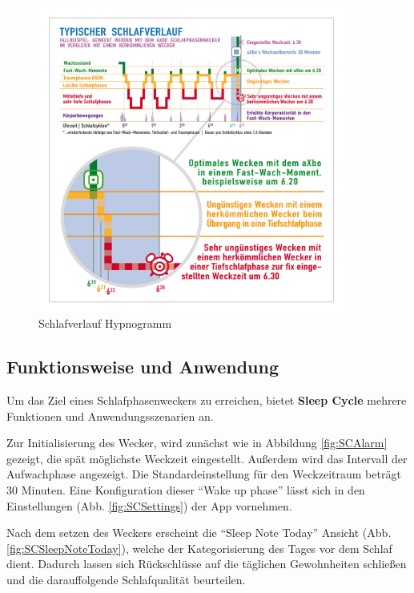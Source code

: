 \begin{figure}[h]
\centering
\includegraphics[width=0.9\textwidth]{images/aXbo_Schlafverlauf_Hypnogramm_DE.png}
\caption{Schlafverlauf Hypnogramm \cite{fig:Hypnogramm}}
\label{fig:Hypnogramm}
\end{figure}


\subsection{Funktionsweise und Anwendung}
\label{ch:Apps:sec:Sleepcycle:subsec:FuA}

Um das Ziel eines Schlafphasenweckers zu erreichen, bietet \textbf{Sleep Cycle} mehrere Funktionen und Anwendungsszenarien an.

Zur Initialisierung des Wecker, wird zunächst wie in Abbildung \ref{fig:SCAlarm} gezeigt, die spät möglichste Weckzeit eingestellt.
Außerdem wird das Intervall der Aufwachphase angezeigt.
Die Standardeinstellung für den Weckzeitraum beträgt 30 Minuten.
Eine Konfiguration dieser "`Wake up phase"' lässt sich in den Einstellungen (Abb. \ref{fig:SCSettings}) der App vornehmen.

Nach dem setzen des Weckers erscheint die "`Sleep Note Today"' Ansicht (Abb. \ref{fig:SCSleepNoteToday}), welche der Kategorisierung des Tages vor dem Schlaf dient. Dadurch lassen sich Rückschlüsse auf die täglichen Gewohnheiten schließen und die darauffolgende Schlafqualität beurteilen.

